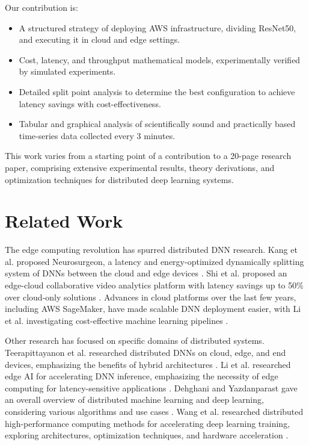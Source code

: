 \documentclass[conference]{IEEEtran}
\begin{document}
Our contribution is:
\begin{itemize}
  \item A structured strategy of deploying AWS infrastructure, dividing ResNet50, and executing it in cloud and edge settings.
  \item Cost, latency, and throughput mathematical models, experimentally verified by simulated experiments.
  \item Detailed split point analysis to determine the best configuration to achieve latency savings with cost-effectiveness.
  \item Tabular and graphical analysis of scientifically sound and practically based time-series data collected every 3 minutes.
\end{itemize}

This work varies from a starting point of a contribution to a 20-page research paper, comprising extensive experimental results, theory derivations, and optimization techniques for distributed deep learning systems.

\section{Related Work}
The edge computing revolution has spurred distributed DNN research. Kang et al. proposed Neurosurgeon, a latency and energy-optimized dynamically splitting system of DNNs between the cloud and edge devices \cite{kang2017neurosurgeon}. Shi et al. proposed an edge-cloud collaborative video analytics platform with latency savings up to 50\% over cloud-only solutions \cite{shi2016edge}. Advances in cloud platforms over the last few years, including AWS SageMaker, have made scalable DNN deployment easier, with Li et al. investigating cost-effective machine learning pipelines \cite{li2020edge}.

Other research has focused on specific domains of distributed systems. Teerapittayanon et al. researched distributed DNNs on cloud, edge, and end devices, emphasizing the benefits of hybrid architectures \cite{teerapittayanon2017distributed}. Li et al. researched edge AI for accelerating DNN inference, emphasizing the necessity of edge computing for latency-sensitive applications \cite{li2020edge}. Dehghani and Yazdanparast gave an overall overview of distributed machine learning and deep learning, considering various algorithms and use cases \cite{dehghani2023distributed}. Wang et al. researched distributed high-performance computing methods for accelerating deep learning training, exploring architectures, optimization techniques, and hardware acceleration \cite{wang2024distributed}.
\end{document}

